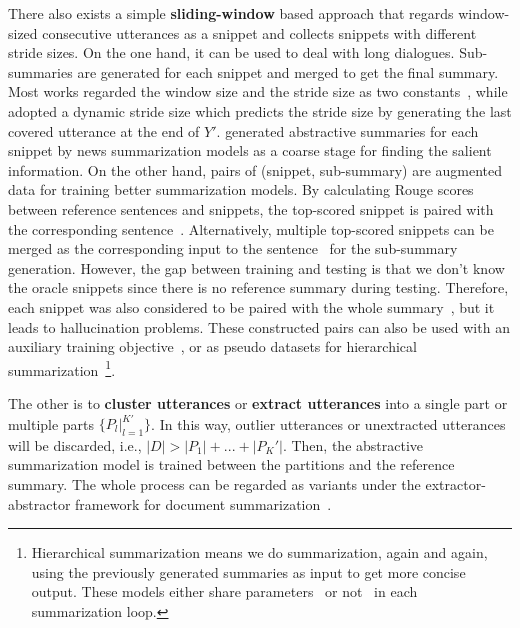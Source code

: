 There also exists a simple \textbf{sliding-window} based approach that regards window-sized consecutive utterances as a snippet and collects snippets with different stride sizes.
On the one hand, it can be used to deal with long dialogues. Sub-summaries are generated for each snippet and merged to get the final summary.
Most works regarded the window size and the stride size as two constants~\cite{koay2021sliding,liu2021topic,zhang2021leveraging,zhang2021summ},
while \citet{liu2021dynamic} adopted a dynamic stride size which predicts the stride size by generating the last covered utterance at the end of $Y'$.
\citet{koay2021sliding} generated abstractive summaries for each snippet by news summarization models as a coarse stage for finding the salient information.
On the other hand, pairs of (snippet, sub-summary) are augmented data for training better summarization models.
By calculating Rouge scores between reference sentences and snippets, 
the top-scored snippet is paired with the corresponding sentence~\cite{liu2021topic, zhang2021summ}.
Alternatively, multiple top-scored snippets can be merged as the corresponding input to the sentence~\cite{zhang2021leveraging} for the sub-summary generation. 
However, the gap between training and testing is that we don't know the oracle snippets since there is no reference summary during testing.
Therefore, each snippet was also considered to be paired with the whole summary~\cite{zhang2021leveraging,zhang2021summ}, but it leads to hallucination problems.
These constructed pairs can also be used with an auxiliary training objective~\cite{liu2021topic}, or as pseudo datasets for hierarchical summarization~\footnote{Hierarchical summarization means we do summarization, again and again, using the previously generated summaries as input to get more concise output. These models either share parameters~\cite{li2021hierarchical} or not~\cite{zhang2021leveraging,zhang2021summ} in each summarization loop.}.



The other is to \textbf{cluster utterances} or \textbf{extract utterances} into a single part or multiple parts $\{P_l|_{l=1}^{K'}\}$. In this way, outlier utterances or unextracted utterances will be discarded, i.e., $|D|>|P_1| + ... + |P_K'|$. Then, the abstractive summarization model is trained between the partitions and the reference summary. The whole process can be regarded as variants under the extractor-abstractor framework for document summarization~\cite{chen2018fast,liu2021keyword}. 

